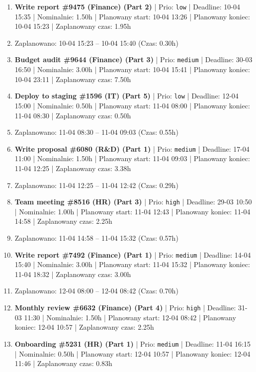 {\begin{enumerate}
  \item [\textbf{14685}] \textbf{Write report \#9475 (Finance) (Part 2)} | Prio: \texttt{low} | Deadline: 10-04 15:35 | Nominalnie: 1.50h | Planowany start: 10-04 13:26 | Planowany koniec: 10-04 15:23 | Zaplanowany czas: 1.95h
  \item [\textbf{PRZERWA}] Zaplanowano: 10-04 15:23 -- 10-04 15:40 (Czas: 0.30h)
  \item [\textbf{14659}] \textbf{Budget audit \#9644 (Finance) (Part 3)} | Prio: \texttt{medium} | Deadline: 30-03 16:50 | Nominalnie: 3.00h | Planowany start: 10-04 15:41 | Planowany koniec: 10-04 23:11 | Zaplanowany czas: 7.50h
  \item [\textbf{14692}] \textbf{Deploy to staging \#1596 (IT) (Part 5)} | Prio: \texttt{low} | Deadline: 12-04 15:00 | Nominalnie: 0.50h | Planowany start: 11-04 08:00 | Planowany koniec: 11-04 08:30 | Zaplanowany czas: 0.50h
  \item [\textbf{PRZERWA}] Zaplanowano: 11-04 08:30 -- 11-04 09:03 (Czas: 0.55h)
  \item [\textbf{14669}] \textbf{Write proposal \#6080 (R\&D) (Part 1)} | Prio: \texttt{medium} | Deadline: 17-04 11:00 | Nominalnie: 1.50h | Planowany start: 11-04 09:03 | Planowany koniec: 11-04 12:25 | Zaplanowany czas: 3.38h
  \item [\textbf{PRZERWA}] Zaplanowano: 11-04 12:25 -- 11-04 12:42 (Czas: 0.29h)
  \item [\textbf{14624}] \textbf{Team meeting \#8516 (HR) (Part 3)} | Prio: \texttt{high} | Deadline: 29-03 10:50 | Nominalnie: 1.00h | Planowany start: 11-04 12:43 | Planowany koniec: 11-04 14:58 | Zaplanowany czas: 2.25h
  \item [\textbf{PRZERWA}] Zaplanowano: 11-04 14:58 -- 11-04 15:32 (Czas: 0.57h)
  \item [\textbf{14642}] \textbf{Write report \#7492 (Finance) (Part 1)} | Prio: \texttt{medium} | Deadline: 14-04 15:40 | Nominalnie: 3.00h | Planowany start: 11-04 15:32 | Planowany koniec: 11-04 18:32 | Zaplanowany czas: 3.00h
  \item [\textbf{PRZERWA}] Zaplanowano: 12-04 08:00 -- 12-04 08:42 (Czas: 0.70h)
  \item [\textbf{14615}] \textbf{Monthly review \#6632 (Finance) (Part 4)} | Prio: \texttt{high} | Deadline: 31-03 11:30 | Nominalnie: 1.50h | Planowany start: 12-04 08:42 | Planowany koniec: 12-04 10:57 | Zaplanowany czas: 2.25h
  \item [\textbf{14671}] \textbf{Onboarding \#5231 (HR) (Part 1)} | Prio: \texttt{medium} | Deadline: 11-04 16:15 | Nominalnie: 0.50h | Planowany start: 12-04 10:57 | Planowany koniec: 12-04 11:46 | Zaplanowany czas: 0.83h

\end{enumerate}}
